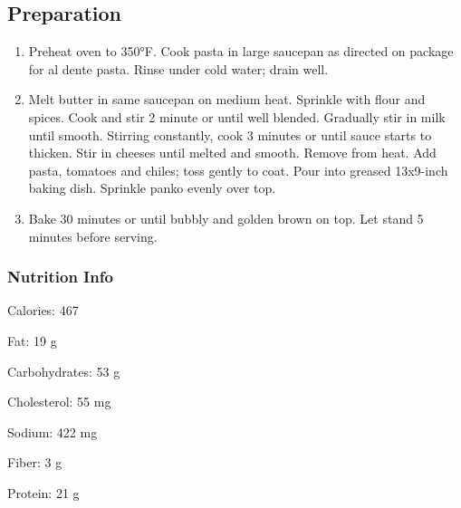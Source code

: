 \subsection{Preparation}
\begin{enumerate}
    \item Preheat oven to 350°F. Cook pasta in large saucepan as directed on package for al dente pasta. Rinse under cold water; drain well.
    \item Melt butter in same saucepan on medium heat. Sprinkle with flour and spices. Cook and stir 2 minute or until well blended. Gradually stir in milk until smooth. Stirring constantly, cook 3 minutes or until sauce starts to thicken. Stir in cheeses until melted and smooth. Remove from heat. Add pasta, tomatoes and chiles; toss gently to coat. Pour into greased 13x9-inch baking dish. Sprinkle panko evenly over top.
    \item Bake 30 minutes or until bubbly and golden brown on top. Let stand 5 minutes before serving.
\end{enumerate}

\subsubsection{Nutrition Info}
Calories: 467

\noindent Fat: 19 g

\noindent Carbohydrates: 53 g

\noindent Cholesterol: 55 mg

\noindent Sodium: 422 mg

\noindent Fiber: 3 g

\noindent Protein: 21 g
